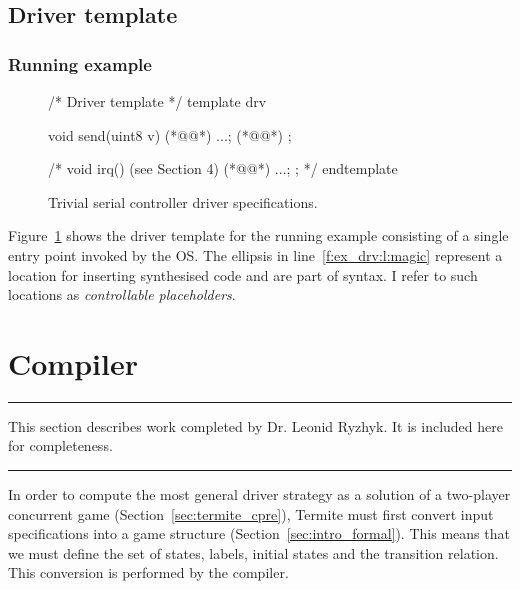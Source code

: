 \subsection{Driver template}

\subsubsection{Running example}

\begin{figure}
\lstset{firstnumber=last}
\begin{tsllisting}[name=ex]
/* Driver template */
template drv 

    void send(uint8 v){ (*@\label{f:ex_drv:l:send}@*)
        ...; (*@\label{f:ex_drv:l:magic}@*)
    }; 

    /*
    void irq(){ (see Section 4) (*@\label{f:ex_drv:l:irq}@*)
        ...;
    }; 
    */
endtemplate
\end{tsllisting}
\caption{Trivial serial controller driver specifications.}
\label{f:ex_drv}
\end{figure}

Figure~\ref{f:ex_drv} shows the driver template for the running example consisting of a single  entry point invoked by the OS\@.  The ellipsis in line~\ref{f:ex_drv:l:magic} represent a location for inserting synthesised code and are part of \tsl syntax.  I refer to such locations as \emph{controllable placeholders}. 

\section{\tsl Compiler}
\label{sec:tsl_compiler}

\hrule
\vspace{10pt}
\begin{center}
This section describes work completed by Dr. Leonid Ryzhyk. It is included here for completeness.
\end{center}
\hrule
\vspace{20pt}

In order to compute the most general driver strategy as a solution of a two-player concurrent game (Section~\ref{sec:termite_cpre}), Termite must first convert input \tsl specifications into a game structure (Section~\ref{sec:intro_formal}). This means that we must define the set of states, labels, initial states and the transition relation. This conversion is performed by the \tsl compiler.

